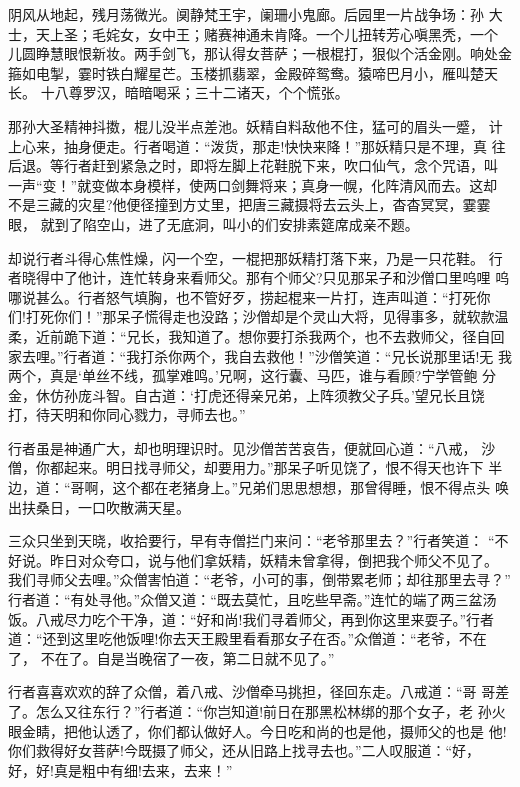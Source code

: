 阴风从地起，残月荡微光。阒静梵王宇，阑珊小鬼廊。后园里一片战争场：孙
大士，天上圣；毛姹女，女中王；赌赛神通未肯降。一个儿扭转芳心嗔黑秃，一个
儿圆睁慧眼恨新妆。两手剑飞，那认得女菩萨；一根棍打，狠似个活金刚。响处金
箍如电掣，霎时铁白耀星芒。玉楼抓翡翠，金殿碎鸳鸯。猿啼巴月小，雁叫楚天长。
十八尊罗汉，暗暗喝采；三十二诸天，个个慌张。

那孙大圣精神抖擞，棍儿没半点差池。妖精自料敌他不住，猛可的眉头一蹙，
计上心来，抽身便走。行者喝道：“泼货，那走!快快来降！”那妖精只是不理，真
往后退。等行者赶到紧急之时，即将左脚上花鞋脱下来，吹口仙气，念个咒语，叫
一声“变！”就变做本身模样，使两口剑舞将来；真身一幌，化阵清风而去。这却
不是三藏的灾星?他便径撞到方丈里，把唐三藏摄将去云头上，杳杳冥冥，霎霎眼，
就到了陷空山，进了无底洞，叫小的们安排素筵席成亲不题。

却说行者斗得心焦性燥，闪一个空，一棍把那妖精打落下来，乃是一只花鞋。
行者晓得中了他计，连忙转身来看师父。那有个师父?只见那呆子和沙僧口里呜哩
呜哪说甚么。行者怒气填胸，也不管好歹，捞起棍来一片打，连声叫道：“打死你
们!打死你们！”那呆子慌得走也没路；沙僧却是个灵山大将，见得事多，就软款温
柔，近前跪下道：“兄长，我知道了。想你要打杀我两个，也不去救师父，径自回
家去哩。”行者道：“我打杀你两个，我自去救他！”沙僧笑道：“兄长说那里话!无
我两个，真是‘单丝不线，孤掌难鸣。’兄啊，这行囊、马匹，谁与看顾?宁学管鲍
分金，休仿孙庞斗智。自古道：‘打虎还得亲兄弟，上阵须教父子兵。’望兄长且饶
打，待天明和你同心戮力，寻师去也。”

行者虽是神通广大，却也明理识时。见沙僧苦苦哀告，便就回心道：“八戒，
沙僧，你都起来。明日找寻师父，却要用力。”那呆子听见饶了，恨不得天也许下
半边，道：“哥啊，这个都在老猪身上。”兄弟们思思想想，那曾得睡，恨不得点头
唤出扶桑日，一口吹散满天星。

三众只坐到天晓，收拾要行，早有寺僧拦门来问：“老爷那里去？”行者笑道：
“不好说。昨日对众夸口，说与他们拿妖精，妖精未曾拿得，倒把我个师父不见了。
我们寻师父去哩。”众僧害怕道：“老爷，小可的事，倒带累老师；却往那里去寻？”
行者道：“有处寻他。”众僧又道：“既去莫忙，且吃些早斋。”连忙的端了两三盆汤
饭。八戒尽力吃个干净，道：“好和尚!我们寻着师父，再到你这里来耍子。”行者
道：“还到这里吃他饭哩!你去天王殿里看看那女子在否。”众僧道：“老爷，不在了，
不在了。自是当晚宿了一夜，第二日就不见了。”

行者喜喜欢欢的辞了众僧，着八戒、沙僧牵马挑担，径回东走。八戒道：“哥
哥差了。怎么又往东行？”行者道：“你岂知道!前日在那黑松林绑的那个女子，老
孙火眼金睛，把他认透了，你们都认做好人。今日吃和尚的也是他，摄师父的也是
他!你们救得好女菩萨!今既摄了师父，还从旧路上找寻去也。”二人叹服道：“好，
好，好!真是粗中有细!去来，去来！”

